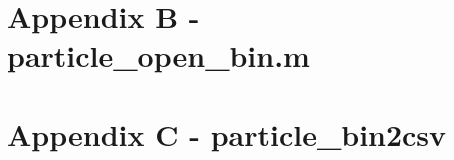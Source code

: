 \documentclass[12pt,letterpaper,titlepage]{article}
\begin{document}
\section{Appendix B - particle\_open\_bin.m}
\label{app: particle_open_bin}

\pagebreak

\section{Appendix C - particle\_bin2csv}
\label{app: particle_bin2csv}


\pagebreak
\glsaddall				%
\renewcommand*{\arraystretch}{0.3}%
\printglossaries
\end{document}
